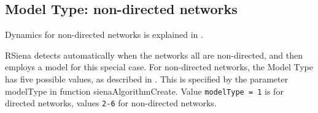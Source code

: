 \documentclass[a4paper,fleqn,11pt]{article}
\newcommand{\+}{\, + \,}
\newcommand{\sfn}[1]{\textsf{#1}}
\newcommand{\RS}{{\sf \textsf{RSiena} }}
\begin{document}

\subsection{Model Type: non-directed networks}
\label{S_modeltype_nd}

Dynamics for non-directed networks is explained in \citet{SnijdersPickup16}.

\RS detects automatically when the networks all are non-directed,
and then employs a model for this special case.
For non-directed networks, the Model Type has five possible values,
as described in \citet{SnijdersPickup16}.
This is specified by the parameter \sfn{modelType} in function
\textsf{sienaAlgorithmCreate}.
Value \texttt{modelType = 1} is for directed networks, values
\texttt{2-6} for non-directed networks.

\end{document}
